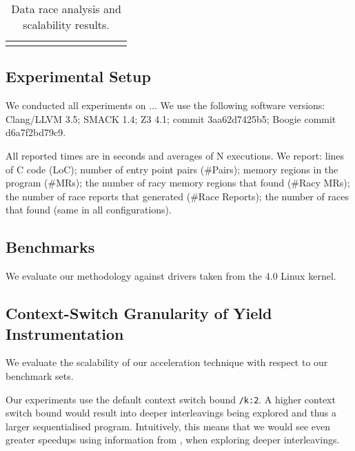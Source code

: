 \newcommand{\colspacing}{\hspace{1.8em}}
\begin{table*}[t]
\small
\centering
\begin{tabular}{l rrr rrr rr r r}
\centering

\end{tabular}
\caption{Data race analysis and scalability results.}
\label{tab:races}
\end{table*}

\subsection{Experimental Setup}
\label{eval:setup}

We conducted all experiments on ... We use the following software versions: Clang/LLVM 3.5; SMACK 1.4; Z3 4.1; \corral commit 3aa62d7425b5; Boogie commit d6a7f2bd79c9.

All reported times are in seconds and averages of N executions. We report: lines of C code (LoC); number of entry point pairs (\#Pairs); memory regions in the program (\#MRs); the number of racy memory regions that \whoop found (\#Racy MRs); the number of race reports that \whoop generated (\#Race Reports); the number of races that \corral found (same in all configurations).

\subsection{Benchmarks}
\label{eval:benchmarks}

We evaluate our methodology against \sizeOfBenchmarks drivers taken from the 4.0 Linux kernel. 

\subsection{Context-Switch Granularity of Yield Instrumentation}
\label{eval:granularity}

We evaluate the scalability of our acceleration technique with respect to our benchmark sets.

Our experiments use the default \corral context switch bound \texttt{/k:2}. A higher context switch bound would result into deeper interleavings being explored and thus a larger sequentialised program. Intuitively, this means that we would see even greater speedups using information from \whoop, when exploring deeper interleavings. 

